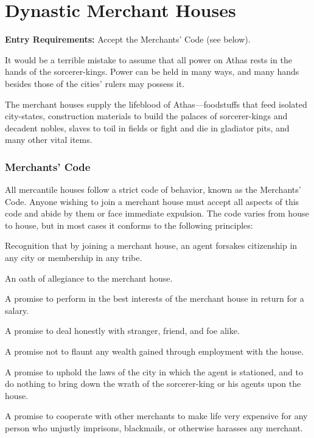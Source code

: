 \section{Dynastic Merchant Houses}

\textbf{Entry Requirements:} Accept the Merchants' Code (see below).

It would be a terrible mistake to assume that all power on Athas rests in the hands of the sorcerer-kings. Power can be held in many ways, and many hands besides those of the cities' rulers may possess it.

The merchant houses supply the lifeblood of Athas---foodstuffs that feed isolated city-states, construction materials to build the palaces of sorcerer-kings and decadent nobles, slaves to toil in fields or fight and die in gladiator pits, and many other vital items.

\subsubsection{Merchants' Code}
All mercantile houses follow a strict code of behavior, known as the Merchants' Code. Anyone wishing to join a merchant house must accept all aspects of this code and abide by them or face immediate expulsion. The code varies from house to house, but in most cases it conforms to the following principles:

\begin{enumerate*}
\item Recognition that by joining a merchant house, an agent forsakes citizenship in any city or membership in any tribe.
\item An oath of allegiance to the merchant house.
\item A promise to perform in the best interests of the merchant house in return for a salary.
\item A promise to deal honestly with stranger, friend, and foe alike.
\item A promise not to flaunt any wealth gained through employment with the house.
\item A promise to uphold the laws of the city in which the agent is stationed, and to do nothing to bring down the wrath of the sorcerer-king or his agents upon the house.
\item A promise to cooperate with other merchants to make life very expensive for any person who unjustly imprisons, blackmails, or otherwise harasses any merchant.
\end{enumerate*}

